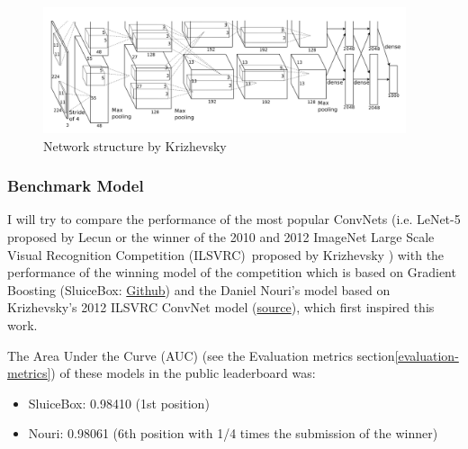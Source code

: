 \documentclass[]{article}
\newcommand{\imagenet}{ImageNet Large Scale Visual Recognition Competition (ILSVRC)}
\begin{document}
\begin{figure}[htpb!]
\centering
\includegraphics[width= 0.95\textwidth]{images/imagenet12}
\caption{Network structure by Krizhevsky \cite{Krizhevsky12} \label{img:imagenet12}}
\end{figure}


\subsubsection{Benchmark Model}\label{benchmark-model}

I will try to compare the performance of the most popular ConvNets (i.e. LeNet-5 proposed by Lecun \cite{Lecun98} or the winner of the 2010 and 2012 \imagenet \, proposed by Krizhevsky \cite{Krizhevsky12}) with the performance of the winning model of the competition which is based on Gradient Boosting (SluiceBox: \href{https://github.com/nmkridler/moby}{Github}) and the Daniel Nouri's model based on Krizhevsky's 2012 ILSVRC ConvNet model \cite{Krizhevsky12} (\href{https://speakerdeck.com/dnouri/practical-deep-neural-nets-for-detecting-marine-mammals/}{source}), which first inspired this work.

The Area Under the Curve (AUC) (see the Evaluation metrics section\ref{evaluation-metrics}) of these models in the public leaderboard was:
\begin{itemize}
	\item SluiceBox: 0.98410 (1st position)
	\item Nouri: 0.98061 (6th position with 1/4 times the submission of the winner)
\end{itemize}
\end{document}
